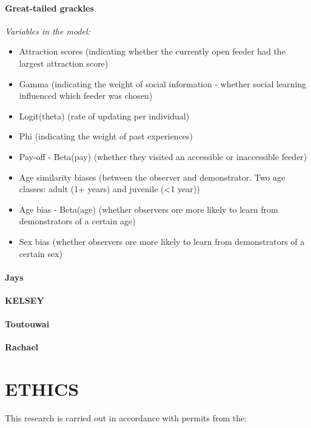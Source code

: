 \documentclass[
]{article}
\providecommand{\tightlist}{%
  \setlength{\itemsep}{0pt}\setlength{\parskip}{0pt}}
\begin{document}
\hypertarget{great-tailed-grackles-1}{%
\paragraph{Great-tailed grackles}\label{great-tailed-grackles-1}}

\emph{Variables in the model:}

\begin{itemize}
\tightlist
\item
  Attraction scores (indicating whether the currently open feeder had
  the largest attraction score)
\item
  Gamma (indicating the weight of social information - whether social
  learning influenced which feeder was chosen)
\item
  Logit(theta) (rate of updating per individual)
\item
  Phi (indicating the weight of past experiences)
\item
  Pay-off - Beta(pay) (whether they visited an accessible or
  inaccessible feeder)
\item
  Age similarity biases (between the observer and demonstrator. Two age
  classes: adult (1+ years) and juvenile (\textless1 year))
\item
  Age bias - Beta(age) (whether observers ore more likely to learn from
  demonstrators of a certain age)
\item
  Sex bias (whether observers ore more likely to learn from
  demonstrators of a certain sex)
\end{itemize}

\hypertarget{jays-1}{%
\paragraph{Jays}\label{jays-1}}

\textbf{KELSEY}

\hypertarget{toutouwai-2}{%
\paragraph{Toutouwai}\label{toutouwai-2}}

\textbf{Rachael}

\hypertarget{ethics}{%
\section{ETHICS}\label{ethics}}

This research is carried out in accordance with permits from the:
\end{document}
